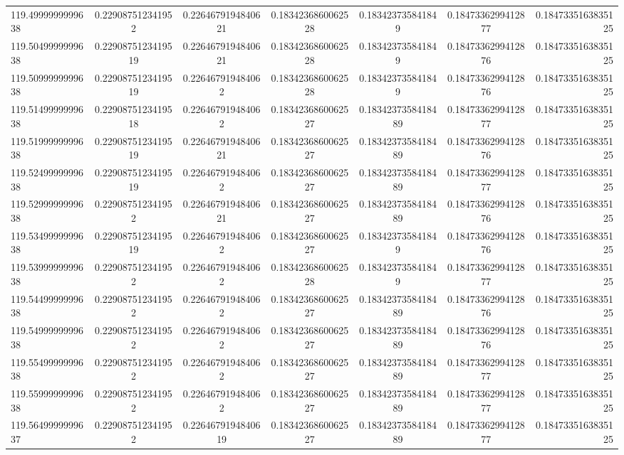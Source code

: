 \begin{tabular}{ l | c | c | c | c | c | r }
119.4999999999638  & 0.229087512341952  & 0.2264679194840621  & 0.1834236860062528  & 0.183423735841849  & 0.1847336299412877  & 0.1847335163835125 \\
119.5049999999638  & 0.2290875123419519  & 0.2264679194840621  & 0.1834236860062528  & 0.183423735841849  & 0.1847336299412876  & 0.1847335163835125 \\
119.5099999999638  & 0.2290875123419519  & 0.226467919484062  & 0.1834236860062528  & 0.183423735841849  & 0.1847336299412876  & 0.1847335163835125 \\
119.5149999999638  & 0.2290875123419518  & 0.226467919484062  & 0.1834236860062527  & 0.1834237358418489  & 0.1847336299412877  & 0.1847335163835125 \\
119.5199999999638  & 0.2290875123419519  & 0.2264679194840621  & 0.1834236860062527  & 0.1834237358418489  & 0.1847336299412876  & 0.1847335163835125 \\
119.5249999999638  & 0.2290875123419519  & 0.226467919484062  & 0.1834236860062527  & 0.1834237358418489  & 0.1847336299412877  & 0.1847335163835125 \\
119.5299999999638  & 0.229087512341952  & 0.2264679194840621  & 0.1834236860062527  & 0.1834237358418489  & 0.1847336299412876  & 0.1847335163835125 \\
119.5349999999638  & 0.2290875123419519  & 0.226467919484062  & 0.1834236860062527  & 0.183423735841849  & 0.1847336299412876  & 0.1847335163835125 \\
119.5399999999638  & 0.229087512341952  & 0.226467919484062  & 0.1834236860062528  & 0.183423735841849  & 0.1847336299412877  & 0.1847335163835125 \\
119.5449999999638  & 0.229087512341952  & 0.226467919484062  & 0.1834236860062527  & 0.1834237358418489  & 0.1847336299412876  & 0.1847335163835125 \\
119.5499999999638  & 0.229087512341952  & 0.226467919484062  & 0.1834236860062527  & 0.1834237358418489  & 0.1847336299412876  & 0.1847335163835125 \\
119.5549999999638  & 0.229087512341952  & 0.226467919484062  & 0.1834236860062527  & 0.1834237358418489  & 0.1847336299412877  & 0.1847335163835125 \\
119.5599999999638  & 0.229087512341952  & 0.226467919484062  & 0.1834236860062527  & 0.1834237358418489  & 0.1847336299412877  & 0.1847335163835125 \\
119.5649999999637  & 0.229087512341952  & 0.2264679194840619  & 0.1834236860062527  & 0.1834237358418489  & 0.1847336299412877  & 0.1847335163835125 \\

\end{tabular}
